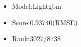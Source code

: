 \documentclass{tikzposter} %
\begin{document}
\begin{columns}
{%
}


{
  \begin{itemize}
    \item
    Model:Lightgbm
    \item
    Score:0.93740(RMSE)
    \item  
    Rank:3027/8738
  \end{itemize}



}
\end{columns}
\end{document}
